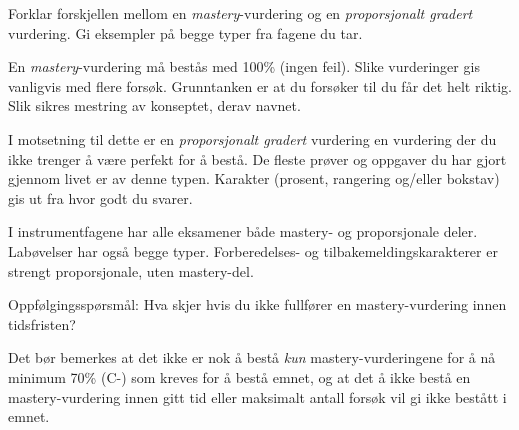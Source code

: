 
Forklar forskjellen mellom en {\it mastery}-vurdering og en {\it proporsjonalt gradert} vurdering. Gi eksempler på begge typer fra fagene du tar.







En {\it mastery}-vurdering må bestås med 100\% (ingen feil). Slike vurderinger gis vanligvis med flere forsøk. Grunntanken er at du forsøker til du får det helt riktig. Slik sikres mestring av konseptet, derav navnet.

I motsetning til dette er en {\it proporsjonalt gradert} vurdering en vurdering der du ikke trenger å være perfekt for å bestå. De fleste prøver og oppgaver du har gjort gjennom livet er av denne typen. Karakter (prosent, rangering og/eller bokstav) gis ut fra hvor godt du svarer.

\vskip 10pt

I instrumentfagene har alle eksamener både mastery- og proporsjonale deler. Labøvelser har også begge typer. Forberedelses- og tilbakemeldingskarakterer er strengt proporsjonale, uten mastery-del.

\vskip 10pt

Oppfølgingsspørsmål: Hva skjer hvis du ikke fullfører en mastery-vurdering innen tidsfristen?







Det bør bemerkes at det ikke er nok å bestå {\it kun} mastery-vurderingene for å nå minimum 70\% (C-) som kreves for å bestå emnet, og at det å ikke bestå en mastery-vurdering innen gitt tid eller maksimalt antall forsøk vil gi ikke bestått i emnet.


